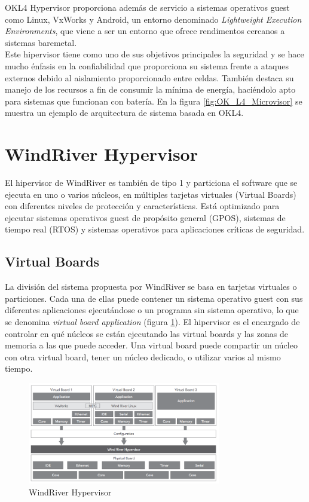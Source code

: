 OKL4 Hypervisor proporciona además de servicio a sistemas operativos guest como Linux, VxWorks y Android, un entorno denominado \textit{Lightweight Execution Environments}, que viene a ser un entorno que ofrece rendimentos cercanos a sistemas baremetal.\\
Este hipervisor tiene como uno de sus objetivos principales la seguridad \cite{okl4_2} y se hace mucho énfasis en la confiabilidad que proporciona su sistema frente a ataques externos debido al aislamiento proporcionado entre celdas. También destaca su manejo de los recursos a fin de consumir la mínima de energía, haciéndolo apto para sistemas que funcionan con batería. En la figura \ref{fig:OK_L4_Microvisor} se muestra un ejemplo de arquitectura de sistema basada en OKL4.


\section{WindRiver Hypervisor}
El hipervisor de WindRiver \cite{windriver_1} es también de tipo 1 y particiona el software que se ejecuta en uno o varios núcleos, en múltiples tarjetas virtuales (Virtual Boards) con diferentes niveles de protección y características. Está optimizado para ejecutar sistemas operativos guest de propósito general (\acrshort{GPOS}), sistemas de tiempo real (\acrshort{RTOS}) y sistemas operativos para aplicaciones críticas de seguridad.
\subsection{Virtual Boards}
La división del sistema propuesta por WindRiver se basa en tarjetas virtuales o particiones. Cada una de ellas puede contener un sistema operativo guest con sus diferentes aplicaciones ejecutándose o un programa sin sistema operativo, lo que se denomina \textit{virtual board application} (figura \ref{fig:windriver_hyp}). El hipervisor es el encargado de controlar en qué núcleos se están ejecutando las virtual boards y las zonas de memoria a las que puede acceder. Una virtual board puede compartir un núcleo con otra virtual board, tener un núcleo dedicado, o utilizar varios al mismo tiempo.
\begin{figure}[h]
	\centering
	\includegraphics[width=0.75\textwidth]{recursos/windriver_hyp.png}
	\caption{WindRiver Hypervisor}
	\label{fig:windriver_hyp}
\end{figure}

